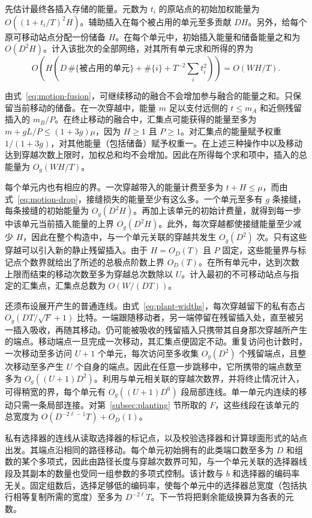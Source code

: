 先估计最终各插入存储的能量。元数为 $t_i$ 的原站点的初始加权能量为 $O((1+t_i/T)^2H)$。辅助插入在每个被占用的单元至多贡献 $DH$。另外，给每个原可移动站点分配一份储备 $H$。在每个单元中，初始插入能量和储备能量之和为 $O(D^2H)$。计入该批次的全部网络，对其所有单元求和所得的界为 \[
 O\!\left(H\left(D\,\#\{\text{被占用的单元}\}
                  +\#\{i\}+T^{-2}\sum_i t_i^2\right)\right)
       =O(WH/T).
\]

由式~\eqref{eq:motion-fusion}，可继续移动的融合不会增加参与融合的能量之和。只保留当前移动的储备。在一次穿越中，能量 $m$ 足以支付远侧的 $t\le m_A$ 和近侧残留插入的 $m_B/P$。在终止移动的融合中，汇集点可能获得的能量至多为 $m+gL/P\le(1+3g)\mu$，因为 $H\ge1$ 且 $P\ge1$。对汇集点的能量赋予权重 $1/(1+3g)$，对其他能量（包括储备）赋予权重一。在上述三种操作中以及移动达到穿越次数上限时，加权总和均不会增加。因此在所得每个求和项中，插入的总能量为 $O_g(WH/T)$。

每个单元内也有相应的界。一次穿越带入的能量计费至多为 $t+H\le\mu$，而由式~\eqref{eq:motion-drop}，接缝损失的能量至少有这么多。一个单元至多有 $g$ 条接缝，每条接缝的初始能量为 $O_g(D^2H)$。再加上该单元的初始计费量，就得到每一步中该单元当前插入能量的上界 $O_g(D^2H)$。此外，每次穿越都使接缝能量至少减少 $H$，因此在整个构造中，与一个单元关联的穿越共发生 $O_g(D^2)$ 次。只有这些穿越可以引入新的静止残留插入。由于 $H=O_D(T)$ 且 $P$ 固定，这些能量界与标记点个数界就给出了所述的总极点阶数上界 $O_D(T)$。在所有单元中，达到次数上限而结束的移动次数至多为穿越总次数除以 $U$。计入最初的不可移动站点与指定的汇集点，汇集点总数为 $O(W/(DT))$。

还须布设展开产生的普通连线。由式~\eqref{eq:plant-widths}，每次穿越留下的私有态占 $O_g(DT/\sqrt F+1)$ 比特。一端跟随移动者，另一端停留在残留插入处，直至被另一插入吸收，再随其移动。仍可能被吸收的残留插入只携带其自身那次穿越所产生的端点。移动端点一旦完成一次移动，其汇集点便固定不动。重复访问也计数时，一次移动至多访问 $U+1$ 个单元，每次访问至多收集 $O_g(D^2)$ 个残留端点，且整次移动至多产生 $U$ 个自身的端点。因此在任意一步跳移中，它所携带的端点数至多为 $O_g((U+1)D^2)$。利用与单元相关联的穿越次数界，并将终止情况计入，可得稍宽的界，每个单元有 $O_g((U+1)D^6)$ 段局部连线。单一单元内连续的移动只需一条局部连接。对第~\ref{subsec:planting} 节所取的 $F$，这些线段在该单元的总宽度为 $O(D^{-2\ell-1}T)+O_D(1)$。

私有选择器的连线从读取选择器的标记点，以及校验选择器和计算球面形式的站点出发。其端点沿相同的路径移动。每个单元初始拥有的此类端口数至多为 $D$ 和组数的某个多项式，因此由路径长度与穿越次数界可知，与一个单元关联的选择器线段及其副本的数量也受同一组参数的多项式控制。该计数与 $b$ 和选择器的编码率无关。固定组数后，选择足够低的编码率，使每个单元中的选择器总宽度（包括执行相等复制所需的宽度）至多为 $D^{-2\ell}T$。下一节将把剩余能级换算为各表的元数。
